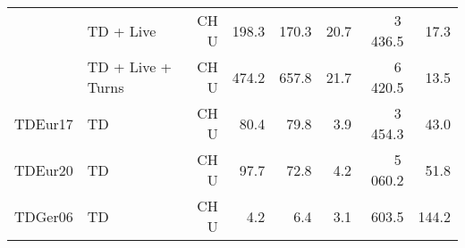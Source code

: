 \begin{tabular}{llrrrrrr}
        & TD + Live & CH U &            198.3 &            170.3 &      20.7 &                    3\,436.5 &     17.3 \\
        & TD + Live + Turns & CH U &            474.2 &            657.8 &      21.7 &                    6\,420.5 &     13.5 \\ \addlinespace
TDEur17 & TD & CH U &             80.4 &             79.8 &       3.9 &                    3\,454.3 &     43.0 \\
TDEur20 & TD & CH U &             97.7 &             72.8 &       4.2 &                    5\,060.2 &     51.8 \\
TDGer06 & TD & CH U &              4.2 &              6.4 &       3.1 &                     603.5 &    144.2 \\
\bottomrule
\end{tabular}

